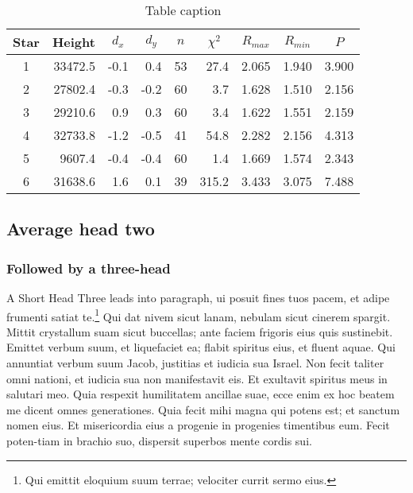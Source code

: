 \documentclass[numbers,compress]{vmsta}
\theoremstyle{definition}
\begin{document}
\begin{table}
\caption{Table caption}\label{tbl-2} %
\begin{tabular*}{\textwidth}{@{\extracolsep{\fill}}crrrrrrrr@{}}
\hline
Star & Height & \multicolumn{1}{c}{$d_{x}$} &
\multicolumn{1}{c}{$d_{y}$} &
\multicolumn{1}{c}{$n$} &
\multicolumn{1}{c}{$\chi^2$} &
\multicolumn{1}{c}{$R_{max}$} &
\multicolumn{1}{c}{$R_{min}$} &
\multicolumn{1}{c}{$P$}  \\
\hline
1 &33472.5 &-0.1 &0.4  &53 &27.4 &2.065  &1.940 &3.900\\
2 &27802.4 &-0.3 &-0.2 &60 &3.7  &1.628  &1.510 &2.156\\
3 &29210.6 &0.9  &0.3  &60 &3.4  &1.622  &1.551 &2.159\\
4 &32733.8 &-1.2 &-0.5 &41 &54.8 &2.282  &2.156 &4.313\\
5 & 9607.4 &-0.4 &-0.4 &60 &1.4  &1.669  &1.574 &2.343\\
6 &31638.6 &1.6  &0.1  &39 &315.2 & 3.433 &3.075 &7.488\\
\hline
\end{tabular*}
\end{table}


\subsection{Average head two}

\subsubsection{Followed by a three-head}

A Short Head Three leads into paragraph, ui posuit fines tuos pacem,
et adipe frumenti satiat te.\footnote{Qui emittit eloquium suum terrae;
velociter currit sermo eius.} Qui dat nivem sicut lanam, nebulam
sicut cinerem spargit. Mittit crystallum suam sicut buccellas; ante
faciem frigoris eius quis sustinebit. Emittet verbum suum, et
liquefaciet ea; flabit spiritus eius, et fluent aquae. Qui annuntiat
verbum suum Jacob, justitias et iudicia sua Israel. Non fecit taliter omni
nationi, et iudicia sua non manifestavit eis. Et exultavit spiritus meus
in salutari meo.  Quia respexit humilitatem ancillae suae, ecce enim ex
hoc beatem me dicent omnes generationes. Quia fecit mihi magna qui potens
est; et sanctum nomen eius. Et misericordia eius a progenie in progenies
timentibus eum. Fecit poten-tiam in brachio suo, dispersit superbos mente
cordis sui.
\end{document}
